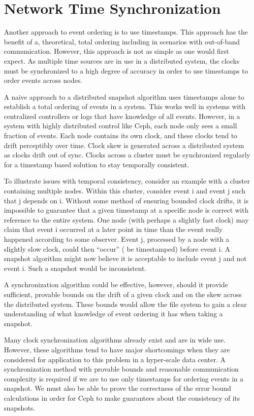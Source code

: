 \section{Network Time Synchronization}

Another approach to event ordering is to use timestamps. This approach
has the benefit of a, theoretical, total ordering including in
scenarios with out-of-band communication. However, this approach is
not as simple as one would first expect. As multiple time sources are
in use in a distributed system, the clocks must be synchronized to a
high degree of accuracy in order to use timestamps to order events
across nodes.

A naive approach to a distributed snapshot algorithm uses timestamps
alone to establish a total ordering of events in a system. This works
well in systems with centralized controllers or logs that have
knowledge of all events. However, in a system with highly distributed
control like Ceph, each node only sees a small fraction of
events. Each node contains its own clock, and these clocks tend to
drift perceptibly over time. Clock skew is generated across a
distributed system as clocks drift out of sync. Clocks across a
cluster must be synchronized regularly for a timestamp based solution
to stay temporally consistent.

To illustrate issues with temporal consistency, consider an example
with a cluster containing multiple nodes. Within this cluster,
consider event i and event j such that j depends on i. Without some
method of ensuring bounded clock drifts, it is impossible to guarantee
that a given timestamp at a specific node is correct with reference to
the entire system. One node (with perhaps a slightly fast clock) may
claim that event i occurred at a later point in time than the event
really happened according to some observer. Event j, processed by a
node with a slightly slow clock, could then “occur” ( be timestamped)
before event i. A snapshot algorithm might now believe it is
acceptable to include event j and not event i. Such a snapshot would
be inconsistent.

A synchronization algorithm could be effective, however, should it
provide sufficient, provable bounds on the drift of a given clock and
on the skew across the distributed system. These bounds would allow
the file system to gain a clear understanding of what knowledge of
event ordering it has when taking a snapshot.

Many clock synchronization algorithms already exist and are in wide
use. However, these algorithms tend to have major shortcomings when
they are considered for application to this problem in a hyper-scale
data center. A synchronization method with provable bounds and
reasonable communication complexity is required if we are to use only
timestamps for ordering events in a snapshot. We must also be able to
prove the correctness of the error bound calculations in order for
Ceph to make guarantees about the consistency of its snapshots.

